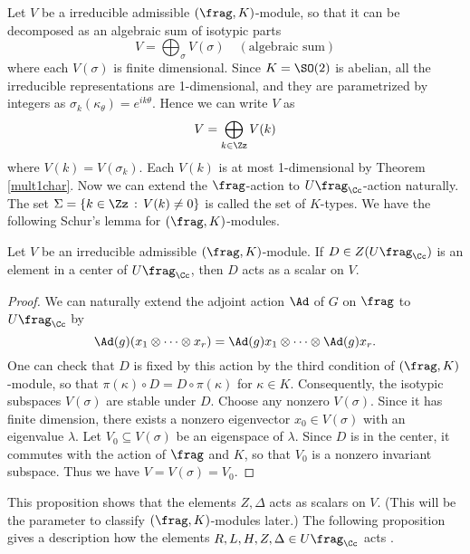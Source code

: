 Let $V$ be a irreducible admissible $(\frag, K)$-module, so that it can be decomposed as an algebraic sum of isotypic parts 
$$
V = \bigoplus _{\sigma} V(\sigma)\quad (\text{algebraic sum})
$$
where each $V(\sigma)$ is finite dimensional. 
Since $K = \SO(2)$ is abelian, all the irreducible representations are 1-dimensional, and they are parametrized by integers as $\sigma_{k}(\kappa_{\theta}) = e^{ik\theta}$. Hence we can write $V$ as
$$
V = \bigoplus_{k\in \Zz} V(k)
$$
where $V(k) = V(\sigma_{k})$. 
Each $V(k)$ is at most 1-dimensional by Theorem \ref{mult1char}.   Now we can extend the $\frag$-action to $U\frag_{\Cc}$-action naturally. 
The set $\Sigma = \{k\in \Zz\,:\, V(k)\neq 0\}$ is called the set of $K$-types. 
We have the following Schur's lemma for $(\frag, K)$-modules. 
\begin{proposition}
Let $V$ be an irreducible admissible $(\frag, K)$-module. If $D\in Z(U\frag_{\Cc})$ is an element in a center of $U\frag_{\Cc}$, then $D$ acts as a scalar on $V$. 
\end{proposition}
\begin{proof}
We can naturally extend the adjoint action $\Ad$ of $G$ on $\frag$ to $U\frag_{\Cc}$ by 
$$
\Ad(g) (x_{1}\otimes \cdots \otimes x_{r}) = \Ad(g)x_{1} \otimes \cdots \otimes \Ad(g)x_{r}. 
$$
One can check that $D$ is fixed by this action by the third condition of $(\frag, K)$-module, so that $\pi(\kappa)\circ D = D\circ \pi(\kappa)$ for $\kappa\in K$. 
Consequently, the isotypic subspaces $V(\sigma)$ are stable under $D$. 
Choose any nonzero $V(\sigma)$. Since it has finite dimension, there exists a nonzero eigenvector $x_{0}\in V(\sigma)$ with an eigenvalue $\lambda$. Let $V_{0}\subseteq V(\sigma)$ be an eigenspace of $\lambda$. 
Since $D$ is in the center, it commutes with the action of $\frag$ and $K$, so that $V_{0}$ is a nonzero invariant subspace. Thus we have $V = V(\sigma) = V_{0}$. 
\end{proof}
This proposition shows that the elements $Z, \Delta$ acts as scalars on $V$. (This will be the parameter to classify $(\frag, K)$-modules later.) 
The following proposition gives a description how the elements $R, L, H, Z, \Delta \in U\frag_{\Cc}$ acts . 


